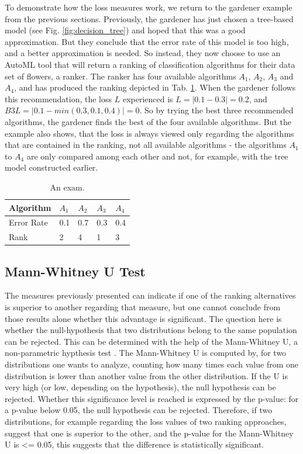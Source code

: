 To demonstrate how the loss measures work, we return to the gardener example from the previous sections. Previously, the gardener has just chosen a tree-based model (see Fig. \ref{fig:decision_tree}) and hoped that this was a good approximation. But they conclude that the error rate of this model is too high, and a better approximation is needed. So instead, they now choose to use an AutoML tool that will return a ranking of classification algorithms for their data set of flowers, a ranker. The ranker has four available algorithms $A_1$, $A_2$, $A_3$ and $A_4$, and has produced the ranking depicted in Tab. \ref{tab:lossTable}. When the gardener follows this recommendation, the loss $L$ experienced is $L=|0.1-0.3|=0.2$, and $\textit{B3L}=|0.1-\textit{min}(0.3,0.1,0.4)|=0$. So by trying the best three recommended algorithms, the gardener finds the best of the four available algorithms. But the example also shows, that the loss is always viewed only regarding the algorithms that are contained in the ranking, not all available algorithms - the algorithms $A_1$ to $A_4$ are only compared among each other and not, for example, with the tree model constructed earlier.

\begin{table}
\begin{tabularx}{\textwidth}{X | X | X | X | X}
Algorithm	& $A_1$	& $A_2$	& $A_3$	& $A_4$ \\\hline
Error Rate	& 0.1	& 0.7	& 0.3	& 0.4	\\
Rank			& 2		& 4		& 1		& 3	
\end{tabularx}
\caption{An exam.}
\label{tab:lossTable}
\end{table}

\subsection{Mann-Whitney U Test}
The measures previously presented can indicate if one of the ranking alternatives is superior to another regarding that measure, but one cannot conclude from those results alone whether this advantage is significant. The question here is whether the null-hypothesis that two distributions belong to the same population can be rejected. This can be determined with the help of the Mann-Whitney U, a non-parametric hypthesis test \cite{mann1947test}. The Mann-Whitney U is computed by, for two distributions one wants to analyze, counting how many times each value from one distribution is lower than another value from the other distribution. If the U is very high (or low, depending on the hypothesis), the null hypothesis can be rejected. Whether this significance level is reached is expressed by the p-value: for a p-value below 0.05, the null hypothesis can be rejected. Therefore, if two distributions, for example regarding the loss values of two ranking approaches, suggest that one is superior to the other, and the p-value for the Mann-Whitney U is <= 0.05, this suggests that the difference is statistically significant.
